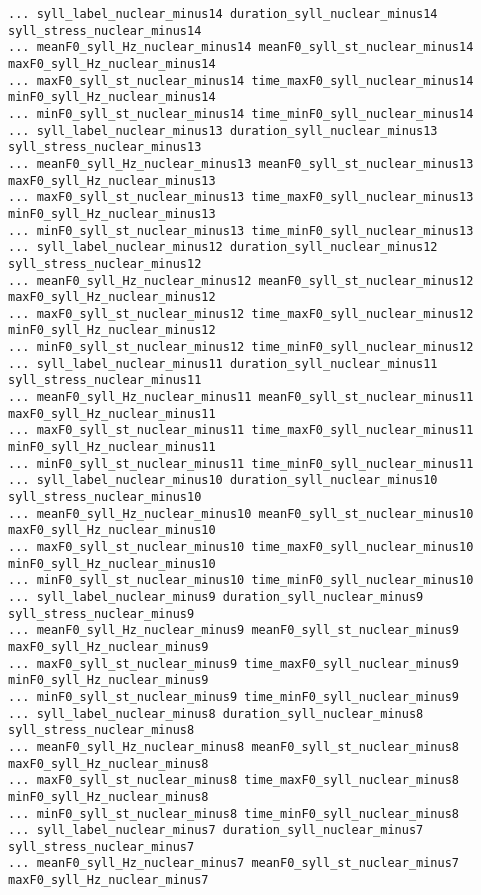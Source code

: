 \begin{Verbatim}[fontsize=\tiny]
... syll_label_nuclear_minus14 duration_syll_nuclear_minus14 syll_stress_nuclear_minus14 
... meanF0_syll_Hz_nuclear_minus14 meanF0_syll_st_nuclear_minus14 maxF0_syll_Hz_nuclear_minus14 
... maxF0_syll_st_nuclear_minus14 time_maxF0_syll_nuclear_minus14 minF0_syll_Hz_nuclear_minus14 
... minF0_syll_st_nuclear_minus14 time_minF0_syll_nuclear_minus14
... syll_label_nuclear_minus13 duration_syll_nuclear_minus13 syll_stress_nuclear_minus13 
... meanF0_syll_Hz_nuclear_minus13 meanF0_syll_st_nuclear_minus13 maxF0_syll_Hz_nuclear_minus13 
... maxF0_syll_st_nuclear_minus13 time_maxF0_syll_nuclear_minus13 minF0_syll_Hz_nuclear_minus13 
... minF0_syll_st_nuclear_minus13 time_minF0_syll_nuclear_minus13
... syll_label_nuclear_minus12 duration_syll_nuclear_minus12 syll_stress_nuclear_minus12 
... meanF0_syll_Hz_nuclear_minus12 meanF0_syll_st_nuclear_minus12 maxF0_syll_Hz_nuclear_minus12 
... maxF0_syll_st_nuclear_minus12 time_maxF0_syll_nuclear_minus12 minF0_syll_Hz_nuclear_minus12 
... minF0_syll_st_nuclear_minus12 time_minF0_syll_nuclear_minus12
... syll_label_nuclear_minus11 duration_syll_nuclear_minus11 syll_stress_nuclear_minus11 
... meanF0_syll_Hz_nuclear_minus11 meanF0_syll_st_nuclear_minus11 maxF0_syll_Hz_nuclear_minus11 
... maxF0_syll_st_nuclear_minus11 time_maxF0_syll_nuclear_minus11 minF0_syll_Hz_nuclear_minus11 
... minF0_syll_st_nuclear_minus11 time_minF0_syll_nuclear_minus11
... syll_label_nuclear_minus10 duration_syll_nuclear_minus10 syll_stress_nuclear_minus10 
... meanF0_syll_Hz_nuclear_minus10 meanF0_syll_st_nuclear_minus10 maxF0_syll_Hz_nuclear_minus10 
... maxF0_syll_st_nuclear_minus10 time_maxF0_syll_nuclear_minus10 minF0_syll_Hz_nuclear_minus10 
... minF0_syll_st_nuclear_minus10 time_minF0_syll_nuclear_minus10
... syll_label_nuclear_minus9 duration_syll_nuclear_minus9 syll_stress_nuclear_minus9 
... meanF0_syll_Hz_nuclear_minus9 meanF0_syll_st_nuclear_minus9 maxF0_syll_Hz_nuclear_minus9 
... maxF0_syll_st_nuclear_minus9 time_maxF0_syll_nuclear_minus9 minF0_syll_Hz_nuclear_minus9 
... minF0_syll_st_nuclear_minus9 time_minF0_syll_nuclear_minus9
... syll_label_nuclear_minus8 duration_syll_nuclear_minus8 syll_stress_nuclear_minus8 
... meanF0_syll_Hz_nuclear_minus8 meanF0_syll_st_nuclear_minus8 maxF0_syll_Hz_nuclear_minus8 
... maxF0_syll_st_nuclear_minus8 time_maxF0_syll_nuclear_minus8 minF0_syll_Hz_nuclear_minus8 
... minF0_syll_st_nuclear_minus8 time_minF0_syll_nuclear_minus8
... syll_label_nuclear_minus7 duration_syll_nuclear_minus7 syll_stress_nuclear_minus7 
... meanF0_syll_Hz_nuclear_minus7 meanF0_syll_st_nuclear_minus7 maxF0_syll_Hz_nuclear_minus7 

\end{Verbatim}
